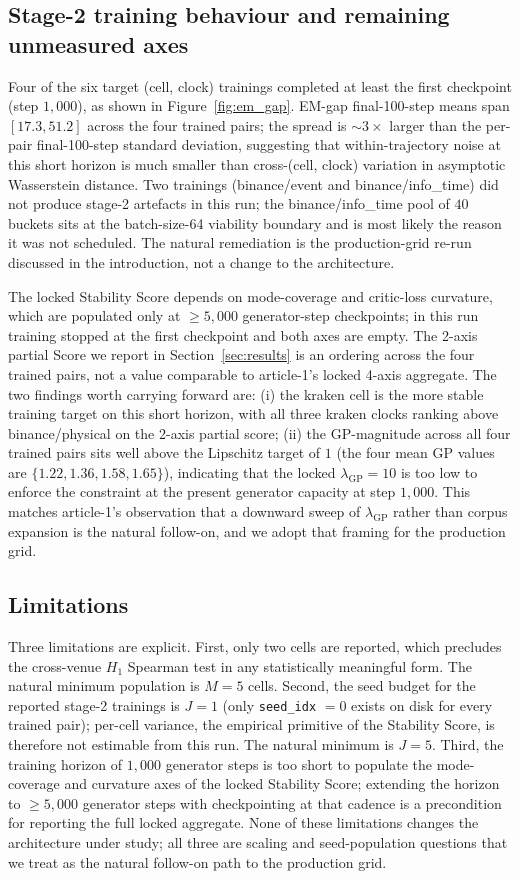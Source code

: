 \subsection*{Stage-2 training behaviour and remaining unmeasured
axes}
Four of the six target (cell, clock) trainings completed at least the
first checkpoint (step $1{,}000$), as shown in
Figure~\ref{fig:em_gap}. EM-gap final-100-step means span
$[17.3, 51.2]$ across the four trained pairs; the spread is
$\sim 3\times$ larger than the per-pair final-100-step standard
deviation, suggesting that within-trajectory noise at this short
horizon is much smaller than cross-(cell, clock) variation in
asymptotic Wasserstein distance. Two trainings (binance/event and
binance/info\_time) did not produce stage-2 artefacts in this run;
the binance/info\_time pool of $40$ buckets sits at the
batch-size-64 viability boundary and is most likely the reason it
was not scheduled. The natural remediation is the production-grid
re-run discussed in the
introduction, not a change to the architecture.

The locked Stability Score depends on mode-coverage and critic-loss
curvature, which are populated only at $\geq 5{,}000$
generator-step checkpoints; in this run training stopped at the
first checkpoint and both axes are empty. The 2-axis partial Score
we report in Section~\ref{sec:results} is an ordering across the four
trained pairs, not a value comparable to article-1's locked
4-axis aggregate. The two findings worth carrying forward are: (i)
the kraken cell is the more stable training target on this short
horizon, with all three kraken clocks ranking above binance/physical
on the 2-axis partial score; (ii) the GP-magnitude across all four
trained pairs sits well above the Lipschitz target of $1$ (the four
mean GP values are $\{1.22, 1.36, 1.58, 1.65\}$), indicating that the
locked $\lambda_{\mathrm{GP}} = 10$ is too low to enforce the
constraint at the present generator capacity at step $1{,}000$. This
matches article-1's observation that a downward sweep of
$\lambda_{\mathrm{GP}}$ rather than corpus expansion is the natural
follow-on, and we adopt that framing for the production grid.

\subsection*{Limitations}
Three limitations are explicit. First, only two cells are reported,
which precludes the cross-venue $H_1$ Spearman test in any
statistically meaningful form. The natural minimum population is
$M = 5$ cells. Second, the seed budget for the reported stage-2
trainings is $J = 1$ (only \texttt{seed\_idx} $= 0$ exists on disk
for every trained pair); per-cell variance, the empirical primitive
of the Stability Score, is therefore not estimable from this run.
The natural minimum is $J = 5$. Third, the training horizon of
$1{,}000$ generator steps is too short to populate the
mode-coverage and curvature axes of the locked Stability Score;
extending the horizon to $\geq 5{,}000$ generator steps with
checkpointing at that cadence is a precondition for reporting the
full locked aggregate. None of these limitations changes the
architecture under study; all three are scaling and seed-population
questions that we treat as the natural follow-on path to the
production grid.
